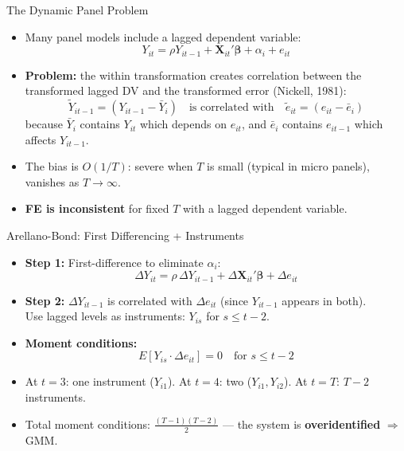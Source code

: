 \documentclass[aspectratio=169, handout, t]{beamer}
\numberwithin{equation}{section}
\begin{document}
\begin{frame}{The Dynamic Panel Problem}
\begin{itemize}
\item Many panel models include a lagged dependent variable:
$$Y_{it}=\rho Y_{it-1}+\bm{X}_{it}'\bm{\beta}+\alpha_i+e_{it}$$\pause
\item \textbf{Problem:} the within transformation creates correlation between the transformed lagged DV and the transformed error (Nickell, 1981):
$$\tilde{Y}_{it-1}=(Y_{it-1}-\bar{Y}_i) \quad\text{is correlated with}\quad \tilde{e}_{it}=(e_{it}-\bar{e}_i)$$
because $\bar{Y}_i$ contains $Y_{it}$ which depends on $e_{it}$, and $\bar{e}_i$ contains $e_{it-1}$ which affects $Y_{it-1}$.\pause
\item The bias is $O(1/T)$: severe when $T$ is small (typical in micro panels), vanishes as $T\to\infty$.
\item \textbf{FE is inconsistent} for fixed $T$ with a lagged dependent variable.
\end{itemize}
\end{frame}

\begin{frame}{Arellano-Bond: First Differencing + Instruments}
\begin{itemize}
\item \textbf{Step 1:} First-difference to eliminate $\alpha_i$:
$$\Delta Y_{it}=\rho\,\Delta Y_{it-1}+\Delta\bm{X}_{it}'\bm{\beta}+\Delta e_{it}$$\pause
\item \textbf{Step 2:} $\Delta Y_{it-1}$ is correlated with $\Delta e_{it}$ (since $Y_{it-1}$ appears in both).\\
Use \alert{lagged levels} as instruments: $Y_{is}$ for $s\leq t-2$.\pause
\item \textbf{Moment conditions:}
$$E[Y_{is}\cdot \Delta e_{it}]=0 \quad\text{for } s\leq t-2$$
\item At $t=3$: one instrument ($Y_{i1}$). At $t=4$: two ($Y_{i1},Y_{i2}$). At $t=T$: $T-2$ instruments.
\item Total moment conditions: $\frac{(T-1)(T-2)}{2}$ --- the system is \textbf{overidentified} $\Rightarrow$ GMM.
\end{itemize}
\end{frame}
\end{document}
